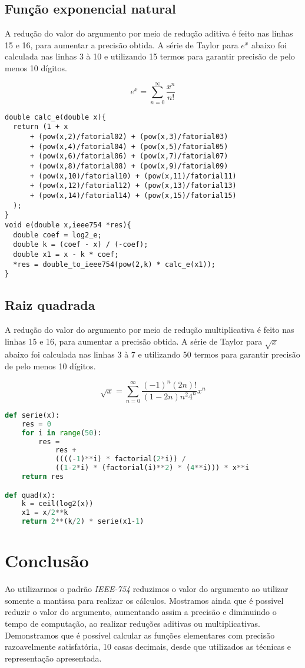 \documentclass[12pt]{article}
\begin{document}
\subsection{Função exponencial natural}

A redução do valor do argumento por meio de redução aditiva é feito nas linhas 15 e 16, para aumentar a precisão obtida. A série de Taylor para $e^x$ abaixo foi calculada nas linhas 3 à 10 e utilizando 15 termos para garantir precisão de pelo menos 10 dígitos.

$$e^x = \sum_{n=0}^{\infty}{\frac{x^n}{n!}}$$

\begin{lstlisting}[caption={Implementação da função \textbf{$e^x$} em C}]
double calc_e(double x){
  return (1 + x 
      + (pow(x,2)/fatorial02) + (pow(x,3)/fatorial03) 
      + (pow(x,4)/fatorial04) + (pow(x,5)/fatorial05) 
      + (pow(x,6)/fatorial06) + (pow(x,7)/fatorial07) 
      + (pow(x,8)/fatorial08) + (pow(x,9)/fatorial09) 
      + (pow(x,10)/fatorial10) + (pow(x,11)/fatorial11) 
      + (pow(x,12)/fatorial12) + (pow(x,13)/fatorial13) 
      + (pow(x,14)/fatorial14) + (pow(x,15)/fatorial15)
  );
}
void e(double x,ieee754 *res){
  double coef = log2_e;
  double k = (coef - x) / (-coef);
  double x1 = x - k * coef;           
  *res = double_to_ieee754(pow(2,k) * calc_e(x1));
}
\end{lstlisting}

\subsection{Raiz quadrada}

A redução do valor do argumento por meio de redução multiplicativa é feito nas linhas 15 e 16, para aumentar a precisão obtida. A série de Taylor para $\sqrt{x}$ abaixo foi calculada nas linhas 3 à 7 e utilizando 50 termos para garantir precisão de pelo menos 10 dígitos.

$$\sqrt{x}= \sum_{n=0}^{\infty}{\frac{(-1)^{n}(2n)!}{(1-2n)n^{2}4^{n}}x^{n}}$$

\begin{lstlisting}[language=Python, caption={Implementação da função $\sqrt{x}$ em Python}]
def serie(x):
    res = 0
    for i in range(50):
        res = 
            res + 
            ((((-1)**i) * factorial(2*i)) /
            ((1-2*i) * (factorial(i)**2) * (4**i))) * x**i
    return res

def quad(x):    
    k = ceil(log2(x))
    x1 = x/2**k
    return 2**(k/2) * serie(x1-1)
\end{lstlisting}

\newpage
\section{Conclusão}
Ao utilizarmos o padrão \textit{IEEE-754} reduzimos o valor do argumento ao utilizar somente a mantissa para realizar os cálculos. Mostramos ainda que é possivel reduzir o valor do argumento, aumentando assim a precisão e diminuindo o tempo de computação, ao realizar reduções aditivas ou multiplicativas. Demonstramos que é possível calcular as funções elementares com precisão razoavelmente satisfatória, 10 casas decimais, desde que utilizados as técnicas e representação apresentada.
\end{document}
